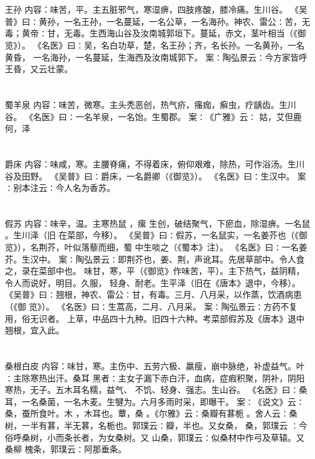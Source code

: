 \documentclass[12pt,UTF8]{ctexbook}
\begin{document}
\section{}王孙
内容：味苦，平。主五脏邪气，寒湿痹，四肢疼酸，膝冷痛。生川谷。 
《吴普》曰∶黄孙，一名王孙，一名蔓延，一名公草，一名海孙。神农、雷公∶苦，无 
毒；黄帝∶甘，无毒。生西海山谷及汝南城郭垣下。蔓延，赤文，茎叶相当（《御览》）。 
《名医》曰∶吴，名白功草，楚，名王孙；齐，名长孙。一名黄孙，一名黄昏， 
一名海孙，一名蔓延，生海西及汝南城郭下。 
案∶陶弘景云∶今方家皆呼王昏，又云壮蒙。 


\section{}蜀羊泉
内容：味苦，微寒。主头秃恶创，热气疥，瘙痂，癣虫，疗龋齿。生川谷。 
《名医》曰∶一名羊泉，一名饴。生蜀郡。 
案∶《广雅》云∶ 姑，艾但鹿何，泽 


\section{}爵床
内容：味咸，寒。主腰脊痛，不得着床，俯仰艰难，除热，可作浴汤。生川谷及田野。 
《吴普》曰∶爵床，一名爵卿（《御览》）。 
《名医》曰∶生汉中。 
案∶别本注云∶今人名为香苏。 


\section{}假苏
内容：味辛，温。主寒热鼠 ，瘰 生创，破结聚气，下瘀血，除湿痹。一名鼠 。生川泽（旧 
在菜部，今移）。 
《吴普》曰∶假苏，一名鼠实，一名姜芥也（《御览》），名荆芥，叶似落藜而细，蜀 
中生啖之（《蜀本》注）。 
《名医》曰∶一名姜芥。生汉中。 
案∶陶弘景云∶即荆芥也，姜、荆，声讹耳。先居草部中。令人食之，录在菜部中也。 
味甘，寒，平（《御览》作味苦，平）。主下热气，益阴精，令人而说好，明目。久服， 
轻身、耐老。生平泽（旧在《唐本》退中，今移）。 
《吴普》曰∶翘根，神农、雷公∶甘，有毒。三月、八月采，以作蒸，饮酒病患（《御 
览》）。 
《名医》曰∶生蒿高，二月、八月采。 
案∶陶弘景云∶方药不复用，俗无识者。 
上草，中品四十九种。旧四十六种。考菜部假苏及《唐本》退中翘根，宜入此。 


\section{}桑根白皮
内容：味甘，寒。主伤中、五劳六极、羸瘦，崩中脉绝，补虚益气。叶∶主除寒热出汗。桑耳 
黑者∶主女子漏下赤白汗，血病，症瘕积聚，阴补，阴阳寒热，无子。五木耳名糯，益气、 
不饥、轻身、强志。生山谷。 
《名医》曰∶桑耳，一名桑菌，一名木麦。生犍为。六月多雨时采，即曝干。 
案∶《说文》云∶桑，蚕所食叶。木 ，木耳也。蕈，桑 。《尔雅》云∶桑瓣有葚栀 
。舍人云∶桑树，一半有葚，半无葚，名栀也。郭璞云∶瓣，半也。又女桑， 桑，郭璞云 
∶今俗呼桑树，小而条长者，为女桑树。又 山桑，郭璞云∶似桑材中作弓及草辕。又桑柳 
槐条，郭璞云∶阿那垂条。 
\end{document}
